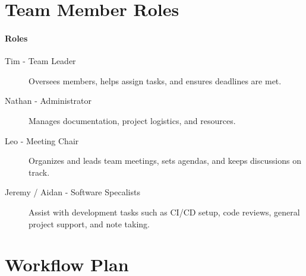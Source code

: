 \documentclass{article}
\begin{document}
\section{Team Member Roles}

\paragraph{Roles} 

\begin{description}
    \item[Tim - Team Leader] Oversees members, helps assign tasks, and ensures deadlines are met.
    \item[Nathan - Administrator] Manages documentation, project logistics, and resources.
    \item[Leo - Meeting Chair] Organizes and leads team meetings, sets agendas, and keeps discussions on track.
    \item[Jeremy / Aidan - Software Specalists] Assist with development tasks such as CI/CD setup, code reviews, general project support, and note taking.
\end{description}



\section{Workflow Plan}
\end{document}
